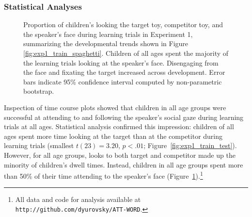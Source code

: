 \documentclass[man,floatsintext]{apa6}
\begin{document}
\subsubsection{Statistical Analyses}

 \begin{figure}[tb]
	\caption{\label{fig:exp1_train} Proportion of children's looking the target toy, competitor toy, and the speaker's face during learning trials in Experiment 1, summarizing the developmental trends shown in Figure \ref{fig:exp1_train_spaghetti}. Children of all ages spent the majority of the learning trials looking at the speaker's face. Disengaging from the face and fixating the target increased across development. Error bars indicate 95\% confidence interval computed by non-parametric bootstrap.}
\end{figure}

Inspection of time course plots showed that children in all age groups were successful at attending to and following the speaker's social gaze during learning trials at all ages. Statistical analysis confirmed this impression: children of all ages spent more time looking at the target than at the competitor during learning trials (smallest $t(23)  = 3.20$, $p < .01$; Figure~\ref{fig:exp1_train_test}). However, for all age groups, looks to both target and competitor made up the minority of children's dwell times. Instead, children in all age groups spent more than 50\% of their time attending to the speaker's face (Figure~\ref{fig:exp1_train}).\footnote{All data and code for analysis available at \small{\tt{http://github.com/dyurovsky/ATT-WORD}}.} 
\end{document}
